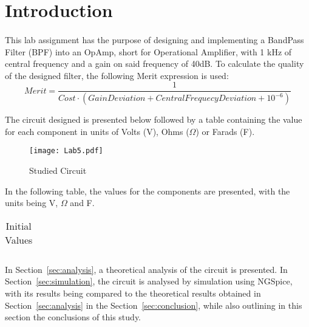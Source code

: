 \section{Introduction}
\label{sec:introduction}
\paragraph{}
\par This lab assignment has the purpose of designing and implementing a BandPass Filter (BPF) into an OpAmp, short for Operational Amplifier, with 1 kHz of central frequency and a gain on said frequency of 40dB. To calculate the quality of the designed filter, the following Merit expression is used:
\[Merit=\frac{1}{Cost \cdot (GainDeviation + CentralFrequecyDeviation + 10^{-6})}\]
\par The circuit designed is presented below followed by a table containing the value for each component in units of Volts (V), Ohms ($\Omega$) or Farads (F).
            
\begin{figure}[H]
    \texttt{[image: Lab5.pdf]}
    \centering
    \caption{Studied Circuit}
    \label{circuit}
\end{figure}
\par In the following table, the values for the components are presented, with the units being V, $\Omega$ and F.

\begin{table}[H]
    \centering
    \begin{tabular}{|c|c|}
    \hline
        
    \end{tabular}
    \caption{Initial Values}
    \label{table4a}
\end{table}

\par In Section~\ref{sec:analysis}, a theoretical analysis of the circuit is
presented. In Section~\ref{sec:simulation}, the circuit is analysed by
simulation using NGSpice, with its results being compared to the theoretical results obtained in
Section~\ref{sec:analysis} in the Section~\ref{sec:conclusion}, while also outlining in this section the conclusions of this study.	
